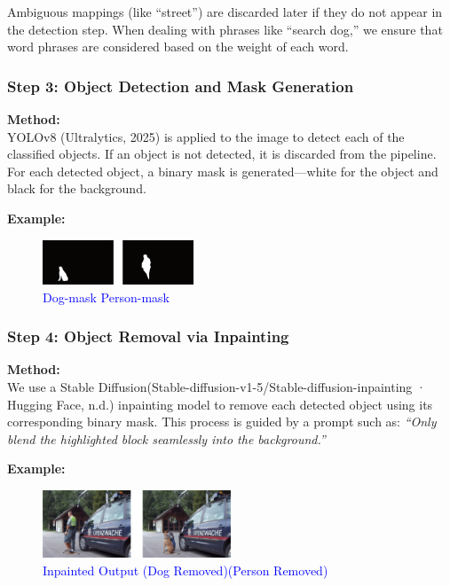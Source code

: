 \documentclass[11pt,letterpaper]{article}
\begin{document}
\noindent
Ambiguous mappings (like ``street'') are discarded later if they do not appear in the detection step. When dealing with phrases like ``search dog,'' we ensure that word phrases are considered based on the weight of each word.



\subsubsection*{Step 3: Object Detection and Mask Generation}

\noindent
\textbf{Method:} \\
YOLOv8 \cite{ultralytics2023segment} (Ultralytics, 2025) is applied to the image to detect each of the classified objects. If an object is not detected, it is discarded from the pipeline. For each detected object, a binary mask is generated—white for the object and black for the background.

\noindent
\textbf{Example:}

\begin{figure}[h]
    \centering
    \includegraphics[width=0.4\textwidth]{midterm_report/assets/mask_along.png}
    \caption{\textcolor{blue}{Dog-mask Person-mask}}
    \label{fig:original_image}
\end{figure}

  

\subsubsection*{Step 4: Object Removal via Inpainting}

\noindent
\textbf{Method:} \\
We use a Stable Diffusion\cite{stabilityai2023inpainting}(Stable-diffusion-v1-5/Stable-diffusion-inpainting · Hugging Face, n.d.) inpainting model to remove each detected object using its corresponding binary mask. This process is guided by a prompt such as: \emph{``Only blend the highlighted block seamlessly into the background.''}

\noindent
\textbf{Example:}

\begin{figure}[h]
    \centering
    \includegraphics[width=0.5\textwidth]{midterm_report/assets/after_mask.png}
    \caption{\textcolor{blue}{Inpainted Output (Dog Removed)(Person Removed)}}
    \label{fig:original_image}
\end{figure}
\end{document}
